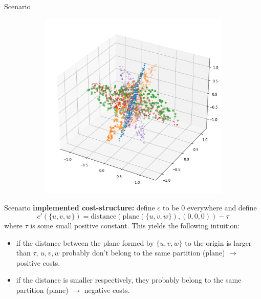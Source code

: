 \documentclass[10pt]{beamer}
\begin{document}
\begin{frame}{Scenario}
\begin{figure}
\begin{subfigure}{.4\textwidth}
            \includegraphics[width=\textwidth]{pics/ds4.png}
        \end{subfigure}
    \end{figure}
\end{frame}

\begin{frame}{Scenario}
    \textbf{implemented cost-structure:} define $c$ to be $0$ everywhere and define $$ c'(\{u,v,w\}) = \mathrm{distance}(\mathrm{plane}(\{u,v,w\}), (0,0,0)) - \tau $$ where $\tau$ is some small positive constant. \pause This yields the following intuition:
    \begin{itemize}
        \item if the distance between the plane formed by $\{u,v,w\}$ to the origin is larger than $\tau$, $u,v,w$ probably don't belong to the same partition (plane) $\rightarrow$ positive costs.
        \item if the distance is smaller respectively, they probably belong to the same partition (plane) $\rightarrow$ negative costs.
    \end{itemize} 
\end{frame}
\end{document}
